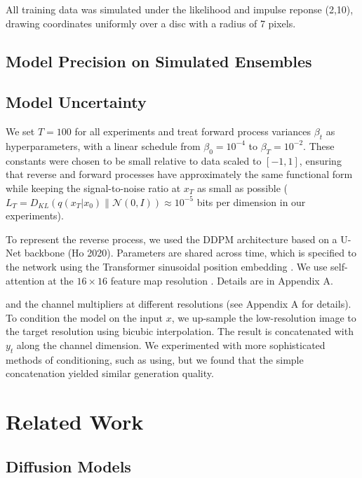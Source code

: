 \documentclass{article}
\begin{document}
All training data was simulated under the likelihood and impulse reponse (2,10), drawing coordinates uniformly over a disc with a radius of 7 pixels.

\subsection{Model Precision on Simulated Ensembles}

\subsection{Model Uncertainty}

We set $T = 100$ for all experiments and treat forward process variances $\beta_{t}$ as hyperparameters, with a linear schedule from $\beta_{0}=10^{-4}$ to $\beta_{T}=10^{-2}$.
These constants were chosen to be small relative to data scaled to $[-1, 1]$, ensuring that reverse and forward processes have approximately the same functional form while keeping the signal-to-noise ratio at $x_T$ as small as possible ($L_T = D_{KL}(q(x_T | x_0) \| \mathcal{N}(0, I)) \approx 10^{-5}$ bits per dimension in our experiments).

To represent the reverse process, we used the DDPM architecture based on a U-Net backbone (Ho 2020). Parameters are shared across time, which is specified to the network using the Transformer sinusoidal position embedding \cite{cite60}. We use self-attention at the $16 \times 16$ feature map resolution \cite{cite63,cite60}. Details are in Appendix A.

and the channel multipliers at different resolutions (see Appendix A for details). To condition the model on the input $x$, we up-sample the low-resolution image to the target resolution using bicubic interpolation. The result is concatenated with $y_t$ along the channel dimension. We experimented with more sophisticated methods of conditioning, such as using, but we found that the simple concatenation yielded similar generation quality.


\section{Related Work}

\subsection{Diffusion Models}
\end{document}
